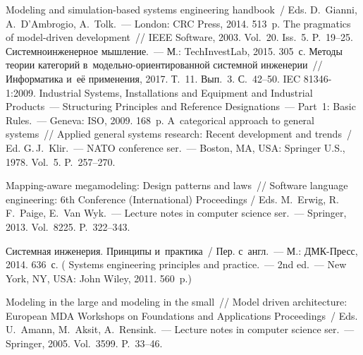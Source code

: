 \begin{multicols}{2}
{\small\frenchspacing
 {%
 \begin{thebibliography}{99}
Modeling and simulation-based systems engineering handbook~/ Eds. D.~Gianni, A.~D'Ambrogio, 
A.~Tolk.~--- London: CRC Press, 2014. 513~p.
 The pragmatics of model-driven development~// IEEE Software, 2003. Vol.~20. 
Iss.~5. P.~19--25.
 Системноинженерное мышление.~--- М.: TechInvestLab, 2015. 305~с.
 Методы теории категорий в~модельно-ори\-ен\-ти\-ро\-ван\-ной сис\-тем\-ной 
инженерии~// Информатика и~её применения, 2017. Т.~11. Вып.~3. С.~42--50.
IEC 81346-1:2009. Industrial Systems, Installations and Equipment and Industrial Products~--- 
Structuring Principles and Reference Designations~--- Part~1: Basic Rules.~--- Geneva: ISO, 2009. 
168~p.
 A~categorical approach to general systems~// 
 Applied general systems research: Recent development and trends~/ Ed. 
G.\,J.~Klir.~--- NATO conference ser.~--- Boston, MA, USA: Springer U.S., 1978. Vol.~5.  P.~257--270.

 Mapping-aware megamodeling: Design patterns and 
laws~//  Software language engineering: 6th Conference (International) Proceedings / Eds. 
M.~Erwig, R.\,F.~Paige, E.~Van Wyk.~--- Lecture notes in computer science ser.~--- Springer, 
2013. Vol.~8225. P.~322--343.

 Системная инженерия. Принципы 
и~практика~/ Пер. с~англ.~--- М.: ДМК-Пресс, 2014. 636~с. ( Systems engineering principles and practice.~--- 2nd ed.~--- New 
York, NY, USA: John Wiley, 2011. 560~p.)

 Modeling in the large 
and modeling in the small~// Model driven architecture: European MDA Workshops on 
Foundations and Applications Proceedings~/ Eds.  U.~\mbox{A{\!\ptb{\ss}}mann}, M.~Aksit, 
A.~Rensink.~--- Lecture notes in computer science ser.~--- Springer, 2005.  Vol.~3599. 
P.~33--46.


\end{thebibliography}}}
\end{multicols}
